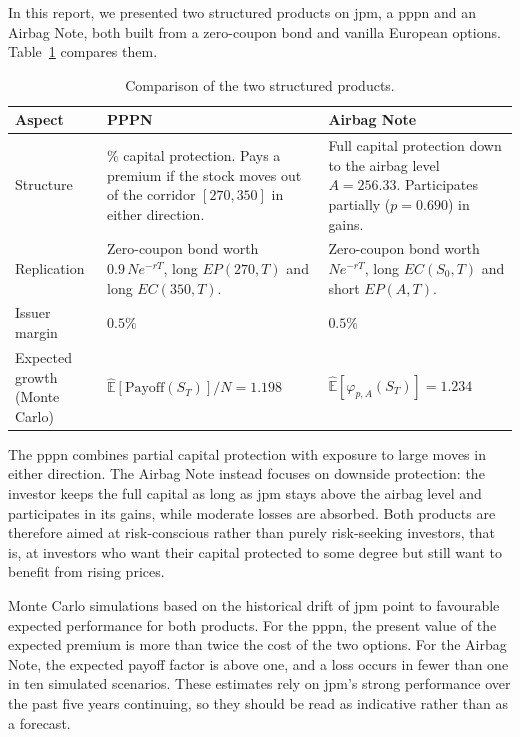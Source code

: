 In this report, we presented two structured products on \gls{jpm}, a \gls{pppn} and an Airbag Note, both built from a zero-coupon bond and vanilla European options.
Table~\ref{tab:structured-products-comparison} compares them.

\begin{table}[H]
    \centering
    \caption{Comparison of the two structured products.}
    \label{tab:structured-products-comparison}
    \begin{tabular}{@{}>{\raggedright\arraybackslash}p{3.5cm}>{\raggedright\arraybackslash}p{6cm}>{\raggedright\arraybackslash}p{6cm}@{}}
    \toprule
    \textbf{Aspect} & \textbf{PPPN} & \textbf{Airbag Note} \\
    \midrule
    Structure &
    90\% capital protection. Pays a premium if the stock moves out of the corridor $[270, 350]$ in either direction. &
    Full capital protection down to the airbag level $A = 256.33$. Participates partially ($p = 0.690$) in gains. \\[2mm]

    Replication &
    Zero-coupon bond worth $0.9\,N e^{-rT}$, long $EP(270,T)$ and long $EC(350,T)$. &
    Zero-coupon bond worth $N e^{-rT}$, long $EC(S_0,T)$ and short $EP(A,T)$. \\[2mm]

    Issuer margin & $0.5\%$ & $0.5\%$ \\[2mm]

    Expected growth (Monte Carlo) &
    $\hat{\mathbb{E}}[\text{Payoff}(S_T)]/N = 1.198$ &
    $\hat{\mathbb{E}}[\varphi_{p,A}(S_T)] = 1.234$ \\
    \bottomrule
    \end{tabular}
\end{table}

The \gls{pppn} combines partial capital protection with exposure to large moves in either direction.
The Airbag Note instead focuses on downside protection: the investor keeps the full capital as long as \gls{jpm} stays above the airbag level and participates in its gains, while moderate losses are absorbed.
Both products are therefore aimed at risk-conscious rather than purely risk-seeking investors, that is, at investors who want their capital protected to some degree but still want to benefit from rising prices.

Monte Carlo simulations based on the historical drift of \gls{jpm} point to favourable expected performance for both products.
For the \gls{pppn}, the present value of the expected premium is more than twice the cost of the two options.
For the Airbag Note, the expected payoff factor is above one, and a loss occurs in fewer than one in ten simulated scenarios.
These estimates rely on \gls{jpm}'s strong performance over the past five years continuing, so they should be read as indicative rather than as a forecast.
